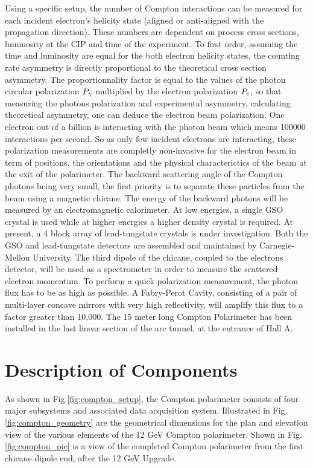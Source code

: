 Using a specific setup, the number of Compton interactions can be measured for each incident
electron's helicity state (aligned or anti-aligned with the propagation direction). These numbers are
dependent on process cross sections, luminosity at the CIP and time of the experiment.
To first order, assuming the time and luminosity are equal for the both electron helicity states, the
counting rate asymmetry is directly proportional to the theoretical cross section asymmetry.
The proportionnality factor is equal to the values of the photon circular polarization $P_{\gamma}$
multiplied by the
electron polarization $P_{{e}}$, so that measuring the photons polarization and experimental asymmetry, calculating theoretical asymmetry,
one can deduce the electron beam polarization. One electron out of a billion is interacting with
the photon beam which means 100000 interactions per second. So as only few incident electrons
are interacting, these polarization measurements are completly non-invasive for the electron beam
in term of positions, the orientations and the physical
characterictics of the beam at the exit of the polarimeter.
The backward scattering angle of the Compton
photons being very small, the first priority is to separate these particles from the beam using a
magnetic chicane. The energy of the backward photons will be measured by an electromagnetic calorimeter. 
At low energies, a single GSO crystal is used while at higher energies a higher density crystal is required.
At present, a 4 block array of lead-tungstate crystals is under investigation. Both the GSO and lead-tungstate
detectors are assembled and maintained  by Carnegie-Mellon University. The third dipole of the chicane, coupled to the electrons
detector, will be used as a spectrometer in order to measure the scattered electron momentum. To perform
a quick polarization measurement, the photon flux has to be as high as possible. A Fabry-Perot Cavity,
consisting of a pair of multi-layer concave mirrors with very high reflectivity, will amplify this flux to a factor
greater than 10,000. The 15 meter long Compton Polarimeter has been installed in the last linear section
of the arc tunnel, at the entrance of Hall A.

\section{Description of Components}
\label{sec:compton_comp}
As  shown in Fig.\ref{fig:compton_setup},
the Compton polarimeter consists of four major subsystems and associated data acquisition system.  Illustrated in Fig.\ref{fig:compton_geometry} are the  geometrical dimensions for the plan and elevation view of the various elements of the 12 GeV Compton polarimeter. Shown in  Fig.\ref{fig:compton_pic} is a  view of the completed Compton polarimeter from the first chicane dipole end, after the 12 GeV Upgrade. 

